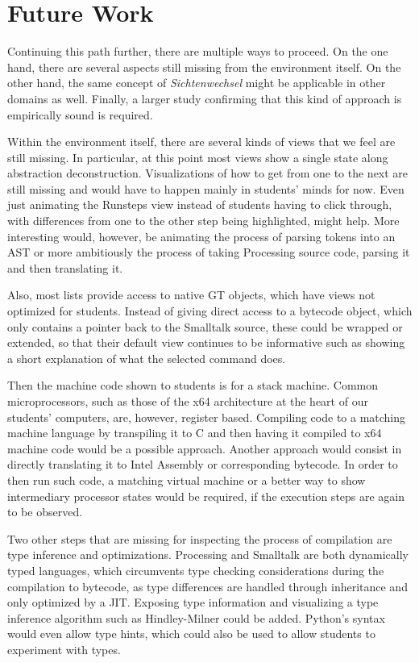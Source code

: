 \section{Future Work} \label{sc_future}

Continuing this path further, there are multiple ways to proceed. On the one hand, there are several aspects still missing from the environment itself. On the other hand, the same concept of \emph{Sichtenwechsel} might be applicable in other domains as well. Finally, a larger study confirming that this kind of approach is empirically sound is required.

Within the environment itself, there are several kinds of views that we feel are still missing. In particular, at this point most views show a single state along abstraction deconstruction. Visualizations of how to get from one to the next are still missing and would have to happen mainly in students' minds for now. Even just animating the Runsteps view instead of students having to click through, with differences from one to the other step being highlighted, might help. More interesting would, however, be animating the process of parsing tokens into an \ac{AST} or more ambitiously the process of taking Processing source code, parsing it and then translating it.

Also, most lists provide access to native \ac{GT} objects, which have views not optimized for students. Instead of \eg giving direct access to a bytecode object, which only contains a pointer back to the Smalltalk source, these could be wrapped or extended, so that their default view continues to be informative such as showing a short explanation of what the selected command does.

Then the machine code shown to students is for a stack machine. Common microprocessors, such as those of the x64 architecture at the heart of our students' computers, are, however, register based. Compiling code to a matching machine language by \eg transpiling it to C and then having it compiled to x64 machine code would be a possible approach. Another approach would consist in directly translating it to Intel Assembly or corresponding bytecode. In order to then run such code, a matching virtual machine or a better way to show intermediary processor states would be required, if the execution steps are again to be observed.

Two other steps that are missing for inspecting the process of compilation are type inference and optimizations. Processing and Smalltalk are both dynamically typed languages, which circumvents type checking considerations during the compilation to bytecode, as type differences are handled through inheritance and only optimized by a \ac{JIT}. Exposing type information and visualizing a type inference algorithm such as Hindley-Milner could be added. Python's syntax would even allow type hints, which could also be used to allow students to experiment with types.

